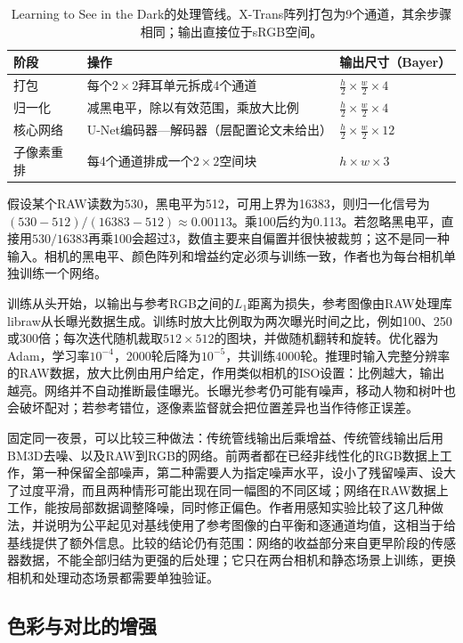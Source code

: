 \begin{table}[htbp]
 \centering
 \small
 \begin{tabularx}{\linewidth}{@{}p{16mm}Xp{28mm}@{}}
  \toprule
  阶段 & 操作 & 输出尺寸（Bayer）\\
  \midrule
  打包 & 每个$2\times2$拜耳单元拆成4个通道 & $\frac h2\times\frac w2\times4$\\
  归一化 & 减黑电平，除以有效范围，乘放大比例 & $\frac h2\times\frac w2\times4$\\
  核心网络 & U-Net编码器—解码器（层配置论文未给出） & $\frac h2\times\frac w2\times12$\\
  子像素重排 & 每4个通道排成一个$2\times2$空间块 & $h\times w\times3$\\
  \bottomrule
 \end{tabularx}
 \caption{Learning to See in the Dark的处理管线。X-Trans阵列打包为9个通道，其余步骤相同；输出直接位于sRGB空间。}
 \label{tab:vision-sid-network}
\end{table}

假设某个RAW读数为530，黑电平为512，可用上界为16383，则归一化信号为$(530-512)/(16383-512)\approx0.00113$。乘100后约为0.113。若忽略黑电平，直接用$530/16383$再乘100会超过3，数值主要来自偏置并很快被裁剪；这不是同一种输入。相机的黑电平、颜色阵列和增益约定必须与训练一致，作者也为每台相机单独训练一个网络。

训练从头开始，以输出与参考RGB之间的$L_1$距离为损失，参考图像由RAW处理库libraw从长曝光数据生成。训练时放大比例取为两次曝光时间之比，例如100、250或300倍；每次迭代随机裁取$512\times512$的图块，并做随机翻转和旋转。优化器为Adam，学习率$10^{-4}$，2000轮后降为$10^{-5}$，共训练4000轮。推理时输入完整分辨率的RAW数据，放大比例由用户给定，作用类似相机的ISO设置：比例越大，输出越亮。网络并不自动推断最佳曝光。长曝光参考仍可能有噪声，移动人物和树叶也会破坏配对；若参考错位，逐像素监督就会把位置差异也当作待修正误差。

固定同一夜景，可以比较三种做法：传统管线输出后乘增益、传统管线输出后用BM3D去噪、以及RAW到RGB的网络。前两者都在已经非线性化的RGB数据上工作，第一种保留全部噪声，第二种需要人为指定噪声水平，设小了残留噪声、设大了过度平滑，而且两种情形可能出现在同一幅图的不同区域；网络在RAW数据上工作，能按局部数据调整降噪，同时修正偏色。作者用感知实验比较了这几种做法，并说明为公平起见对基线使用了参考图像的白平衡和逐通道均值，这相当于给基线提供了额外信息。比较的结论仍有范围：网络的收益部分来自更早阶段的传感器数据，不能全部归结为更强的后处理；它只在两台相机和静态场景上训练，更换相机和处理动态场景都需要单独验证。

\subsection{色彩与对比的增强}
\label{sec:vision-restoration-tone}

